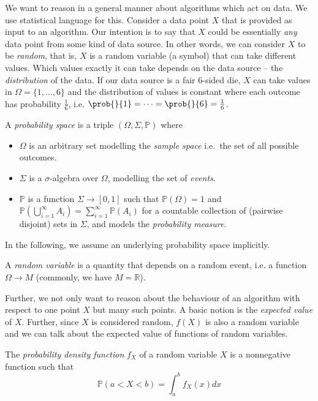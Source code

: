 \documentclass[
	twoside=false, %
]{kaobook}
\begin{document}
We want to reason in a general manner about algorithms which act on data. We use statistical language for this. Consider a data point $X$ that is provided as input to an algorithm. Our intention is to say that $X$ could be essentially \textit{any} data point from some kind of data source. In other words, we can consider $X$ to be \textit{random}, that is, $X$ is a random variable (a symbol) that can take different values. 
Which values exactly it can take depends on the data source -- the \textit{distribution} of the data. If our data source is a fair $6$-sided die, $X$ can take values in $\Omega = \{ 1, \dots, 6 \}$ and the distribution of values is constant where each outcome has probability $\frac{1}{6}$, i.e. $\prob{}{1} = \dots  = \prob{}{6} = \frac{1}{6}$.
\begin{definition}
  A \textit{probability space} is a triple \((\Omega, \Sigma, \mathbb{P})\)
  where
  \begin{itemize}
  \item \(\Omega\) is an arbitrary set modelling the \textit{sample space}
    i.e.~the set of all possible outcomes.
  \item \(\Sigma\) is a \(\sigma\)-algebra
    over \(\Omega\), modelling the set of \textit{events}.
    \item \(\mathbb{P}\) is a function
    \(\Sigma \to [0,1]\) such that \(\mathbb{P}(\Omega)=1\) and
    \(\mathbb{P}\left( \bigcup_{i=1}^\infty A_{i} \right) = \sum_{i=1}^\infty
    \mathbb{P}(A_{i})\) for a countable collection of (pairwise disjoint) sets
    in \(\Sigma\), and models the \textit{probability measure}.
  \end{itemize}
\end{definition}
In the following, we assume an underlying probability space implicitly.
\begin{definition}
  A \textit{random variable} is a quantity
  that depends on a random event, i.e. a function \(\Omega
  \to M\) (commonly, we have \(M=\mathbb{R}\)).
\end{definition}
Further, we not only want to reason about the behaviour of an algorithm with respect to one point $X$ but many such points. A basic notion is the \textit{expected value} of $X$. Further, since $X$ is considered random, $f(X)$ is also a random variable and we can talk about the expected value of functions of random variables.
\begin{definition}
  The \textit{probability density function} $f_X$ of a random variable $X$ is a
  nonnegative function such that
  $$
  \mathbb{P}(a < X < b) = \int_a^b f_X(x) dx
  $$
\end{definition} 
\end{document}
